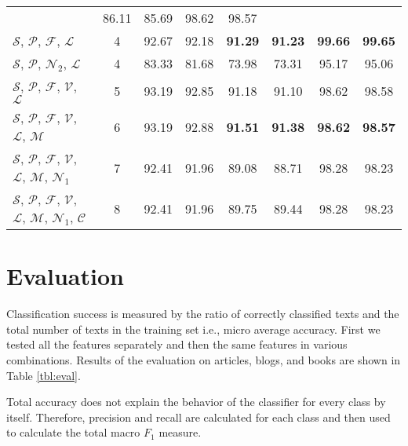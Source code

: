 \documentclass{llncs}
\begin{document}
\begin{table*}[htb]
\begin{tabular}{l c c c c c c c}
& 86.11 & 85.69 & 98.62 & 98.57 \\ $\mathcal{S}$, $\mathcal{P}$, $\mathcal{F}$,
$\mathcal{L}$ & 4 & 92.67 & 92.18 & \textbf{91.29} & \textbf{91.23} &
\textbf{99.66} & \textbf{99.65} \\ $\mathcal{S}$, $\mathcal{P}$,
$\mathcal{N}_2$, $\mathcal{L}$ & 4 & 83.33 & 81.68 & 73.98 & 73.31 & 95.17 &
95.06 \\ $\mathcal{S}$, $\mathcal{P}$, $\mathcal{F}$, $\mathcal{V}$,
$\mathcal{L}$ & 5 & 93.19 & 92.85 & 91.18 & 91.10 & 98.62 & 98.58 \\
$\mathcal{S}$, $\mathcal{P}$, $\mathcal{F}$, $\mathcal{V}$, $\mathcal{L}$,
$\mathcal{M}$ & 6 & 93.19 & 92.88 & \textbf{91.51} & \textbf{91.38} & \textbf{98.62} &
\textbf{98.57} \\ $\mathcal{S}$, $\mathcal{P}$, $\mathcal{F}$, $\mathcal{V}$,
$\mathcal{L}$, $\mathcal{M}$, $\mathcal{N}_1$ & 7 & 92.41 & 91.96 & 89.08 &
88.71 & 98.28 & 98.23 \\ $\mathcal{S}$, $\mathcal{P}$, $\mathcal{F}$,
$\mathcal{V}$, $\mathcal{L}$, $\mathcal{M}$, $\mathcal{N}_1$, $\mathcal{C}$ & 8
& 92.41 & 91.96 & 89.75 & 89.44 & 98.28 & 98.23 \\
\bottomrule
\end{tabular}
\label{tbl:eval}
\end{table*}

\section{Evaluation}
\label{sec:evaluacija}
Classification success is measured by the ratio of correctly classified texts and
the total number of texts in the training set i.e., micro average accuracy.
First we tested all the features separately and then the same features in
various combinations. Results of the evaluation on articles, blogs, and books
are shown in Table \ref{tbl:eval}.

Total accuracy does not explain the behavior of the classifier for every class by
itself. Therefore, precision and recall are calculated for each class and then
used to calculate the total macro $F_1$ measure. 
% 
\end{document}
